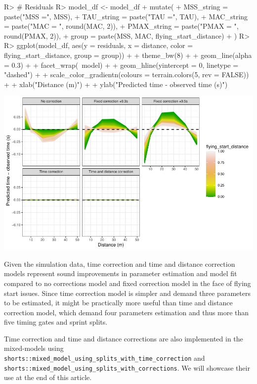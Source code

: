 \documentclass[
]{jss}
\begin{document}
\begin{CodeChunk}
\begin{CodeInput}
R> # Residuals
R> model_df <- model_df %
+   mutate(
+     MSS_string = paste("MSS =", MSS),
+     TAU_string = paste("TAU =", TAU),
+     MAC_string = paste("MAC = ", round(MAC, 2)),
+     PMAX_string = paste("PMAX = ", round(PMAX, 2)),
+     group = paste(MSS, MAC, flying_start_distance)
+   )
R> 
R> ggplot(model_df, aes(y = residuals, x = distance, color = flying_start_distance, group = group)) +
+   theme_bw(8) +
+   geom_line(alpha = 0.3) +
+   facet_wrap(~model) +
+   geom_hline(yintercept = 0, linetype = "dashed") +
+   scale_color_gradientn(colours = terrain.colors(5, rev = FALSE)) +
+   xlab("Distance (m)") +
+   ylab("Predicted time - observed time (s)")
\end{CodeInput}


\begin{center}\includegraphics[width=1\linewidth]{paper_files/figure-latex/unnamed-chunk-40-1} \end{center}

\end{CodeChunk}

Given the simulation data, time correction and time and distance correction models represent sound improvements in parameter estimation and model fit compared to no corrections model and fixed correction model in the face of flying start issues. Since time correction model is simpler and demand three parameters to be estimated, it might be practically more useful than time and distance correction model, which demand four parameters estimation and thus more than five timing gates and sprint splits.

Time correction and time and distance corrections are also implemented in the mixed-models using \texttt{shorts::mixed\_model\_using\_splits\_with\_time\_correction} and \texttt{shorts::mixed\_model\_using\_splits\_with\_corrections}. We will showcase their use at the end of this article.
\end{document}
